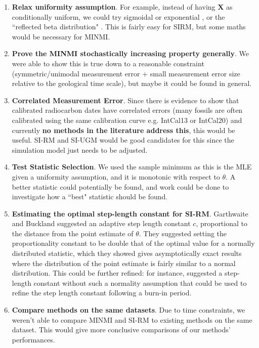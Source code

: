 
\begin{enumerate}
    \item \textbf{Relax uniformity assumption}. For example, instead of having $\bm{X}$ as conditionally uniform, we could try sigmoidal or exponential \cite{Bradshaw2012}, or the ``reflected beta distribution" \cite{Wang2016}. This is fairly easy for SIRM, but some maths would be necessary for MINMI.
    \item \textbf{Prove the MINMI stochastically increasing property generally}. We were able to show this is true down to a reasonable constraint (symmetric/unimodal measurement error + small measurement error size relative to the geological time scale), but maybe it could be found in general.
    \item \textbf{Correlated Measurement Error}. Since there is evidence to show that calibrated radiocarbon dates have correlated errors (many fossils are often calibrated using the same calibration curve e.g. IntCal13 or IntCal20) and currently \textbf{no methods in the literature address this}, this would be useful. SI-RM and SI-UGM would be good candidates for this since the simulation model just needs to be adjusted.
    \item \textbf{Test Statistic Selection}. We used the sample minimum as this is the MLE given a uniformity assumption, and it is monotonic with respect to $\theta$. A better statistic could potentially be found, and work could be done to investigate how a ``best" statistic should be found.
    \item \textbf{Estimating the optimal step-length constant for SI-RM}. Garthwaite and Buckland suggested an adaptive step length constant $c$, proportional to the distance from the point estimate of $\theta$. They suggested setting the proportionality constant to be double that of the optimal value for a normally distributed statistic, which they showed gives asymptotically exact results where the distribution of the point estimate is fairly similar to a normal distribution. This could be further refined: for instance, \citet{LlyodBotev2015} suggested a step-length constant without such a normality assumption that could be used to refine the step length constant following a burn-in period.
    \item \textbf{Compare methods on the same datasets}. Due to time constraints, we weren't able to compare MINMI and SI-RM to existing methods on the same dataset. This would give more conclusive comparisons of our methods' performances.
\end{enumerate}